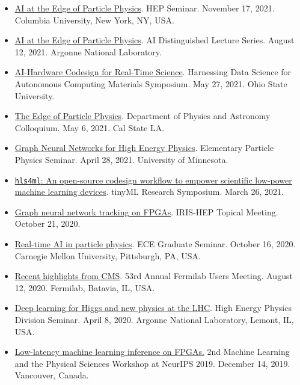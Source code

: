 \documentclass[11pt]{res}
\begin{document}
\begin{resume}
\begin{itemize}
    \item \href{https://physics.columbia.edu/events/hep-seminar-dr-javier-duarte-ucsd}{AI at the Edge of Particle Physics}. HEP Seminar. November 17, 2021. Columbia University, New York, NY, USA.
    \item \href{https://www.anl.gov/event/ai-at-the-edge-of-particle-physics}{AI at the Edge of Particle Physics}. AI Distinguished Lecture Series. August 12, 2021. Argonne National Laboratory.
    \item \href{https://tdai.osu.edu/events/acm-symposium-harnessing-data-science-autonomous-computing-materials}{AI-Hardware Codesign for Real-Time Science}. Harnessing Data Science for Autonomous Computing Materials Symposium. May 27, 2021. Ohio State University.
    \item \href{https://www.calstatela.edu/dept/physics/colloquia-and-events}{The Edge of Particle Physics}. Department of Physics and Astronomy Colloquium. May 6, 2021. Cal State LA.
    \item \href{https://cse.umn.edu/physics/elementary-particle-physics-elem-part-phys-seminar}{Graph Neural Networks for High Energy Physics}. Elementary Particle Physics Seminar. April 28, 2021. University of Minnesota.
    \item \href{https://www.tinyml.org/event/research-symposium-2021/}{\texttt{hls4ml}: An open-source codesign workflow to empower scientific low-power machine learning devices}. tinyML Research Symposium. March 26, 2021.
    \item \href{https://indico.cern.ch/event/955026/}{Graph neural network tracking on FPGAs}. IRIS-HEP Topical Meeting. October 21, 2020.
    \item \href{https://www.cs.cmu.edu/calendar/fri-2020-10-16-1200/ece-graduate-seminar}{Real-time AI in particle physics}. ECE Graduate Seminar. October 16, 2020. Carnegie Mellon University, Pittsburgh, PA, USA.
    \item \href{https://indico.fnal.gov/event/23109/contributions/193292/}{Recent highlights from CMS}. 53rd Annual Fermilab Users Meeting. August 12, 2020. Fermilab, Batavia, IL, USA.
    \item \href{https://indico.fnal.gov/event/22961/}{Deep learning for Higgs and new physics at the LHC}. High Energy Physics Division Seminar. April 8, 2020. Argonne National Laboratory, Lemont, IL, USA.
    \item \href{https://ml4physicalsciences.github.io/2019/files/NeurIPS_ML4PS_2019_74.pdf}{Low-latency machine learning inference on FPGAs.} 2nd Machine Learning and the Physical Sciences Workshop at NeurIPS 2019.  December 14, 2019. Vancouver, Canada.

\end{itemize}
\end{resume}
\end{document}
